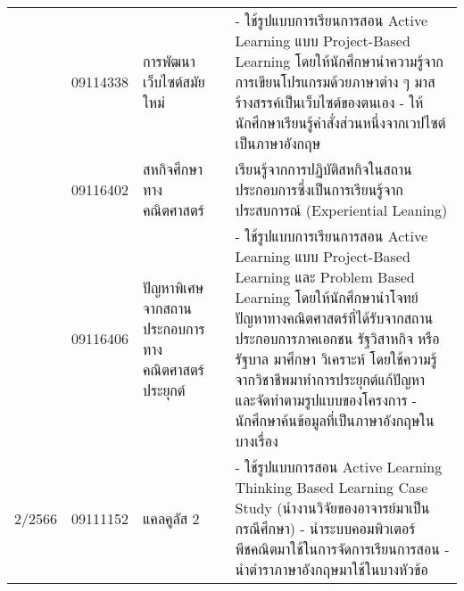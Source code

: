 {\begin{center}
\begin{longtable}{|p{}|p{}|p{}|p{}|}
	\\ 
	\cline{2-4}
	& 09114338
	& การพัฒนาเว็บไซต์สมัยใหม่ & - ใช้รูปแบบการเรียนการสอน Active Learning แบบ Project-Based Learning โดยให้นักศึกษานำความรู้จากการเขียนโปรแกรมด้วยภาษาต่าง ๆ มาสร้างสรรค์เป็นเว็บไซต์ของตนเอง
	\newline - ให้นักศึกษาเรียนรู้คำสั่งส่วนหนึ่งจากเวปไซต์เป็นภาษาอังกฤษ		    
	\\    
	\cline{2-4}
	& 09116402
	& สหกิจศึกษาทางคณิตศาสตร์ & เรียนรู้จากการปฏิบัติสหกิจในสถานประกอบการซึ่งเป็นการเรียนรู้จากประสบการณ์ (Experiential Leaning)
	\\
	\hline
	& 09116406
	& ปัญหาพิเศษจากสถานประกอบการ ทางคณิตศาสตร์ประยุกต์ & - ใช้รูปแบบการเรียนการสอน Active Learning แบบ Project-Based Learning และ Problem Based Learning โดยให้นักศึกษานำโจทย์ปัญหาทางคณิตศาสตร์ที่ได้รับจากสถานประกอบการภาคเอกชน รัฐวิสาหกิจ หรือรัฐบาล มาศึกษา วิเคราะห์ โดยใช้ความรู้จากวิชาชีพมาทำการประยุกต์แก้ปัญหา และจัดทำตามรูปแบบของโครงการ
	\newline- นักศึกษาค้นข้อมูลที่เป็นภาษาอังกฤษในบางเรื่อง
	\\ \cline{2-4} 
	2/2566 & 09111152 & แคลคูลัส 2&-   ใช้รูปแบบการสอน Active Learning Thinking Based Learning Case Study (นำงานวิจัยของอาจารย์มาเป็นกรณีศึกษา) 
	\newline- นำระบบคอมพิวเตอร์พีชคณิตมาใช้ในการจัดการเรียนการสอน 
	\newline- นำตำราภาษาอังกฤษมาใช้ในบางหัวข้อ	
	      

\end{longtable}
\end{center}}
